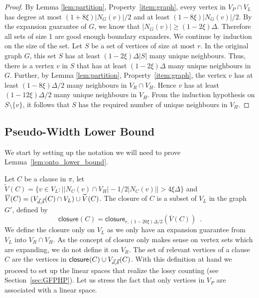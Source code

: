 \documentclass{article}
\providecommand{\abs}[1]{\lvert#1\rvert}
\providecommand{\Abs}[1]{\bigl\lvert#1\bigr\rvert}
\newcommand{\set}[1]{\{ #1 \}}
\newcommand{\setdescr}[3][\mid]{\set{ #2 #1 #3 }}
\newcommand{\setsize}[1]{\lvert#1\rvert}
\newcommand{\eqperiod}{\enspace .}
\newcommand{\refsec}[1]{Section~\ref{#1}}
\newcommand{\refpi}{\pi}
\newcommand{\neigh}[2][]{N_{{#1}}(#2)}
\newcommand{\diff}{\xi}
\newcommand{\GdegMax}{\Delta}
\newcommand{\gdegmax}{\GdegMax}
\newcommand{\V}[1][]{V_{#1}}
\newcommand{\Vl}{\V[L]}
\newcommand{\Vr}{\V[R]}
\newcommand{\Vp}{\V[P]}
\newcommand{\Vh}{\V[H]}
\newcommand{\Gprime}{G'}
\newcommand{\GprimeConstantDeg}{8}
\newcommand{\GprimeConstantExp}{12}
\newcommand{\Vbad}[2][]{\widetilde V^{#1}(#2)}
\newcommand{\VbadThick}[1]{\overline V(#1)}
\newcommand{\vecthr}{\vec{d}}
\newcommand{\vecadv}{\vec{\delta}}
\newcommand{\Vthick}[1]{\ensuremath V_{\vecthr,\vecadv}(#1)}
\newcommand{\PSEUDOWIDTH}{Pseudo-Width\xspace}
\newcommand{\closure}[2][]{\mathsf{closure}_{{#1}}(#2)}
\newcommand{\squeezesubsection}[1]{\subsection{#1}}
\numberwithin{equation}{section}
\begin{document}
\begin{proof}
  By Lemma \ref{lem:partition}, Property~\ref{item:graph}, every vertex in $\Vp\cap \Vl$ 
  has degree at most
  $(1 + \GprimeConstantDeg \diff) \setsize{\neigh[G]{v}}/2$ and at least 
  $(1 - \GprimeConstantDeg \diff) \setsize{\neigh[G]{v}}/2$.
  By the expansion guarantee of $G$, we know that 
  $\setsize{\neigh[G]{v}} \ge (1 - 2\diff) \GdegMax$.
  Therefore all sets of size 1 are good enough boundary expanders. 
  We continue by induction
  on the size of the set. Let $S$ be a set of vertices of size at most $r$. 
  In the original graph $G$,
  this set $S$ has at least $(1 - 2\diff) \GdegMax \abs{S}$ many unique 
  neighbours. Thus, there is a
  vertex $v$ in $S$ that has at least $(1 - 2\diff) \GdegMax$ many unique 
  neighbours in $G$. Further,
  by Lemma \ref{lem:partition}, Property~\ref{item:graph}, the vertex $v$ has at least 
  $(1 - \GprimeConstantDeg \diff) \GdegMax/2$
  many neighbours
  in $\Vr \cap \Vh$. Hence $v$ has at least 
  $(1 - \GprimeConstantExp \diff) \GdegMax/2$
  many unique neighbours in $\Vh$. From the induction 
  hypothesis on $S\setminus\set{v}$, it follows that $S$
  has the required number of unique neighbours in $\Vh$.
\end{proof}
 
\squeezesubsection{\PSEUDOWIDTH Lower Bound}
\label{sec:onto_lower_bound}

We start by setting up the notation we will need to prove 
Lemma~\ref{lem:onto_lower_bound}.

Let $C$ be a clause in $\refpi$, let
 $\Vbad{C} = \setdescr[:]{v \in \Vl }{
			\Abs{ \abs{ \neigh[C]{v} \cap \Vh } - 
			1/2\abs{ \neigh[C]{v} } } >
			4 \diff \GdegMax} $
and $\VbadThick{C} = (\Vthick{C} \cap \Vl) \cup \Vbad{C}$.
The closure of $C$ is a subset of $\Vl$
in the graph $\Gprime$, defined by
\begin{equation}
    \closure{C} = \closure[r, (1 - 20\diff) \gdegmax / 2]{\VbadThick{C}} 
    \eqperiod
\end{equation}
We define the closure only on $\Vl$ as we only have an expansion guarantee
from $\Vl$ into $\Vr \cap \Vh$. As the concept of closure only makes sense
on vertex sets which are expanding, we do not define it on $\Vr$.
The set of relevant vertices of a clause $C$ are the vertices in
$\closure{C} \cup \Vthick{C}$.
With this definition at
hand we proceed to set up the linear spaces that realize the lossy counting 
(see \refsec{sec:GFPHP}). Let us stress the fact that only vertices
in $\Vp$ are associated with a linear space.
\end{document}
